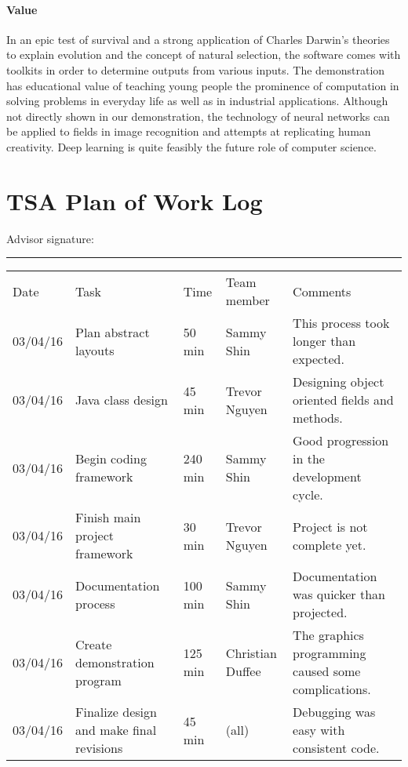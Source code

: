 \documentclass[]{article}
\begin{document}
	\paragraph{Value} In an epic test of survival and a strong application of Charles Darwin's theories to explain evolution and the concept of natural selection, the software comes with toolkits in order to determine outputs from various inputs. The demonstration has educational value of teaching young people the prominence of computation in solving problems in everyday life as well as in industrial applications. Although not directly shown in our demonstration, the technology of neural networks can be applied to fields in image recognition and attempts at replicating human creativity. Deep learning is quite feasibly the future role of computer science.
\cleardoublepage
\section{TSA Plan of Work Log}
	
	Advisor signature:
	\rule{10cm}{0.4pt}

	\begin{center}
	\begin{tabular} { l || p{1.25in}| l| l|p{1.25in}}
		Date & Task & Time & Team member & Comments \\
		03/04/16 & Plan abstract layouts & 50 min & Sammy Shin & This process took longer than expected. \\
		03/04/16 & Java class design & 45 min & Trevor Nguyen & Designing object oriented fields and methods.\\
		03/04/16 & Begin coding framework & 240 min & Sammy Shin & Good progression in the development cycle.\\
		03/04/16 & Finish main project framework & 30 min & Trevor Nguyen & Project is not complete yet.\\
		03/04/16 & Documentation process & 100 min & Sammy Shin & Documentation was quicker than projected.\\
		03/04/16 & Create demonstration program & 125 min & Christian Duffee & The graphics programming caused some complications.\\
		03/04/16 & Finalize design and make final revisions & 45 min & (all) & Debugging was easy with consistent code.\\
		
		
	\end{tabular}
	\end{center}
\cleardoublepage
\end{document}
